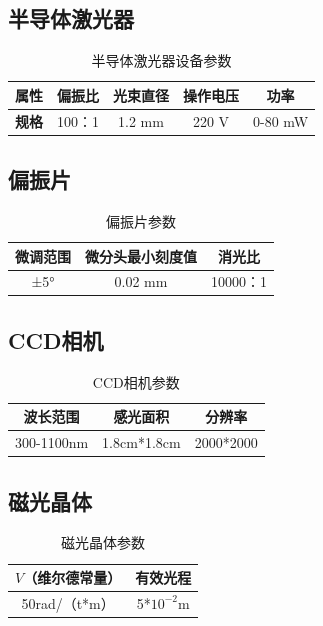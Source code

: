 \documentclass[12pt]{ctexart}
\numberwithin{equation}{section} %
\begin{document}
\subsection{半导体激光器}
    \begin{table}[H] %
    \centering
    \caption{半导体激光器设备参数}
    \begin{tabular}{lcccc}
    \toprule
    \textbf{属性} & \textbf{偏振比} & \textbf{光束直径} & \textbf{操作电压} & \textbf{功率} \\
    \midrule
    \textbf{规格} & 100：1 & 1.2 mm & 220 V & 0-80 mW \\
    \bottomrule
    \end{tabular}
    \label{tab:laser}
    \end{table}
\subsection{偏振片}
\begin{table}[H]
    \centering
    \caption{偏振片参数}
    \begin{tabular}{ccc}
    \toprule
    \textbf{微调范围} & \textbf{微分头最小刻度值} & \textbf{消光比} \\
    \midrule
    ±5° & 0.02 mm & 10000：1 \\
    \bottomrule
    \end{tabular}
    \label{tab:polarizer}
    \end{table}
\subsection{CCD相机}
    \begin{table}[H]
        \centering
        \caption{CCD相机参数}
        \begin{tabular}{ccc}
        \toprule
        \textbf{波长范围} & \textbf{感光面积} & \textbf{分辨率} \\
        \midrule
        300-1100nm & 1.8cm*1.8cm & 2000*2000 \\
        \bottomrule
        \end{tabular}
        \end{table}
\subsection{磁光晶体}
\begin{table}[H]
    \centering
    \caption{磁光晶体参数}
    \begin{tabular}{cc}
    \toprule
    \textbf{$V$（维尔德常量）} & \textbf{有效光程} \\
    \midrule
    50rad/（t*m）& 5*$10^{-2}$m\\
    \bottomrule
    \end{tabular}
    \end{table}
\end{document}
